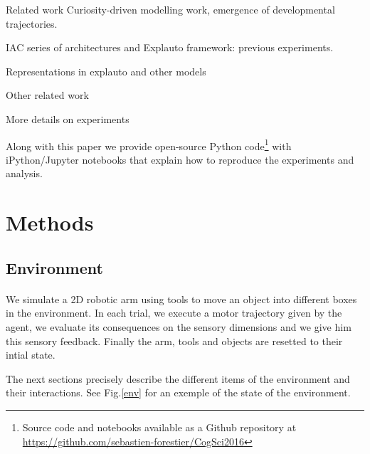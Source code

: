 \documentclass[10pt,letterpaper]{article}
\begin{document}
	
	
	Related work
	Curiosity-driven modelling work, emergence of developmental trajectories.
	\cite{oudeyer_intrinsic_2007} 
	\cite{oudeyer_what_2007}
	\cite{flow}
	\cite{sch}
	\cite{santucci2013}
	\cite{cangelosi2010integration}
	\cite{oudeyer2014evolution}
	
	
	IAC series of architectures and Explauto framework: previous experiments.
	\cite{moulin-frier_self-organization_2014}
	\cite{moulin-frier_explauto:_2014}
	\cite{baranes2010intrinsically}
	\cite{riac}
	\cite{baranes_active_2013}
	
	Representations in explauto and other models 
	\cite{mugan2009}
	\cite{metzen2013}
	\cite{horde}
	\cite{mugan}
	\cite{vig}
	\cite{sutton1999between}
	
	Other related work
	\cite{ugur2015}
	\cite{schmerlinggoal}
	\cite{forestier2015}
	\cite{unifying}

	More details on experiments
	\cite{ijspeert_dynamical_2013}
	
	\cite{}
	
	Along with this paper we provide open-source Python code\footnote{Source code and notebooks available as a Github repository at \url{https://github.com/sebastien-forestier/CogSci2016}} 
	with iPython/Jupyter notebooks that explain how to reproduce the experiments and analysis. 
	
%

\section{Methods}

	\subsection{Environment}
	
		\paragraph{}
		We simulate a 2D robotic arm using tools to move an object into different boxes in the environment. 		
		In each trial, we execute a motor trajectory given by the agent, we evaluate its consequences on the sensory dimensions and we give him
		this sensory feedback. Finally the arm, tools and objects are resetted to their intial state.
		
		The next sections precisely describe the different items of the environment and their interactions.	
		See Fig.\ref{env} for an exemple of the state of the environment. 
		
\end{document}

